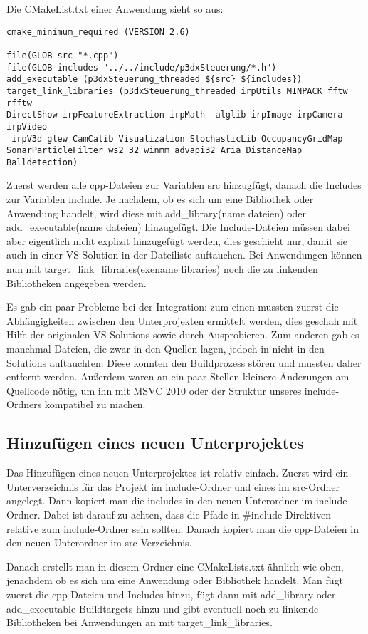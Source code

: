 Die CMakeList.txt einer Anwendung sieht so aus:
\begin{lstlisting}[language={},captionpos=b,caption={CMakeLists.txt des Clients}]
cmake_minimum_required (VERSION 2.6)

file(GLOB src "*.cpp")
file(GLOB includes "../../include/p3dxSteuerung/*.h")
add_executable (p3dxSteuerung_threaded ${src} ${includes})
target_link_libraries (p3dxSteuerung_threaded irpUtils MINPACK fftw rfftw
DirectShow irpFeatureExtraction irpMath  alglib irpImage irpCamera irpVideo
 irpV3d glew CamCalib Visualization StochasticLib OccupancyGridMap
SonarParticleFilter ws2_32 winmm advapi32 Aria DistanceMap Balldetection)

\end{lstlisting}

Zuerst werden alle cpp-Dateien zur Variablen src hinzugfügt, danach die
Includes zur Variablen include. Je nachdem, ob es sich um eine Bibliothek
oder
Anwendung handelt, wird diese mit add\_library(name dateien) oder
add\_executable(name dateien) hinzugefügt. Die Include-Dateien müssen dabei
aber eigentlich nicht explizit hinzugefügt werden, dies geschieht nur,
damit
sie auch in einer VS Solution in der Dateiliste auftauchen. Bei Anwendungen
können nun mit target\_link\_libraries(exename libraries) noch die zu
linkenden
Bibliotheken angegeben werden.

Es gab ein paar Probleme bei der Integration: zum einen mussten zuerst die
Abhängigkeiten zwischen den Unterprojekten ermittelt werden, dies geschah
mit
Hilfe der originalen VS Solutions sowie durch Ausprobieren. Zum anderen gab
 es
manchmal Dateien, die zwar in den Quellen lagen, jedoch in nicht in den
Solutions auftauchten. Diese konnten den Buildprozess stören und mussten
daher
entfernt werden.
Außerdem waren an ein paar Stellen kleinere Änderungen am Quellcode nötig,
um
ihn mit MSVC 2010 oder der Struktur unseres include-Ordners kompatibel zu
machen.

\subsection{Hinzufügen eines neuen Unterprojektes}
\label{sec:hinz-eines-neuen-unterprojektes}
Das Hinzufügen eines neuen Unterprojektes ist relativ einfach.
Zuerst wird ein Unterverzeichnis für das Projekt im include-Ordner und
eines im
src-Ordner angelegt. Dann kopiert man die includes in den neuen Unterordner
 im
include-Ordner. Dabei ist darauf zu achten, dass die Pfade in
\#include-Direktiven relative zum include-Ordner sein sollten. Danach
kopiert
man die cpp-Dateien in den neuen Unterordner im src-Verzeichnis.

Danach erstellt man in diesem Ordner eine CMakeLists.txt ähnlich wie oben,
jenachdem ob es sich um eine Anwendung oder Bibliothek handelt. Man fügt
zuerst
die cpp-Dateien und Includes hinzu, fügt dann mit add\_library oder
add\_executable Buildtargets hinzu und gibt eventuell noch zu linkende
Bibliotheken bei Anwendungen an mit target\_link\_libraries.


